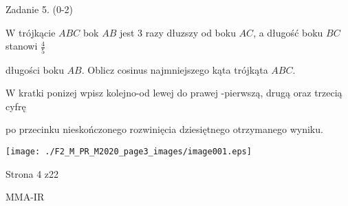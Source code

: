\documentclass[a4paper,12pt]{article}
\begin{document}
Zadanie 5. (0-2)

$\mathrm{W}$ trójkącie $ABC$ bok $AB$ jest 3 razy dłuzszy od boku $AC$, a długość boku $BC$ stanowi $\displaystyle \frac{4}{5}$

długości boku $AB$. Oblicz cosinus najmniejszego kąta trójkąta $ABC.$

$\mathrm{W}$ kratki ponizej wpisz kolejno-od lewej do prawej -pierwszą, drugą oraz trzecią cyfrę

po przecinku nieskończonego rozwinięcia dziesiętnego otrzymanego wyniku.
\begin{center}
\texttt{[image: ./F2\_M\_PR\_M2020\_page3\_images/image001.eps]}
\end{center}
Strona 4 z22

MMA-IR
\end{document}

